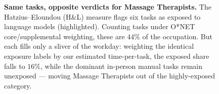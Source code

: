 \begin{figure}[t]

\caption{\textbf{Same tasks, opposite verdicts for Massage Therapists.} The
Hatzius--Eloundou (H\&L) measure flags six tasks as exposed to language models
(highlighted). Counting tasks under O*NET core/supplemental weighting, these are
$44\%$ of the occupation. But each fills only a sliver of the workday: weighting
the identical exposure labels by our estimated time-per-task, the exposed share
falls to $16\%$, while the dominant in-person manual tasks remain unexposed ---
moving Massage Therapists out of the highly-exposed category.}
\label{fig:massage-exposure}
\end{figure}
